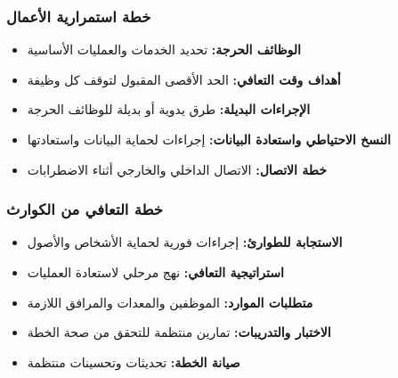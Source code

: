 \subsubsection{خطة استمرارية الأعمال}
\begin{itemize}
    \item \textbf{الوظائف الحرجة:} تحديد الخدمات والعمليات الأساسية
    \item \textbf{أهداف وقت التعافي:} الحد الأقصى المقبول لتوقف كل وظيفة
    \item \textbf{الإجراءات البديلة:} طرق يدوية أو بديلة للوظائف الحرجة
    \item \textbf{النسخ الاحتياطي واستعادة البيانات:} إجراءات لحماية البيانات واستعادتها
    \item \textbf{خطة الاتصال:} الاتصال الداخلي والخارجي أثناء الاضطرابات
\end{itemize}

\subsubsection{خطة التعافي من الكوارث}
\begin{itemize}
    \item \textbf{الاستجابة للطوارئ:} إجراءات فورية لحماية الأشخاص والأصول
    \item \textbf{استراتيجية التعافي:} نهج مرحلي لاستعادة العمليات
    \item \textbf{متطلبات الموارد:} الموظفين والمعدات والمرافق اللازمة
    \item \textbf{الاختبار والتدريبات:} تمارين منتظمة للتحقق من صحة الخطة
    \item \textbf{صيانة الخطة:} تحديثات وتحسينات منتظمة
\end{itemize} 